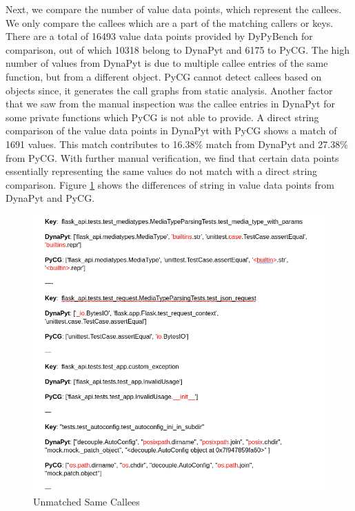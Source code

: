 Next, we compare the number of value data points, which represent the callees.
We only compare the callees which are a part of the matching callers or keys.
There are a total of 16493 value data points provided by DyPyBench for comparison, out of which 10318 belong to DynaPyt and 6175 to PyCG.%
The high number of values from DynaPyt is due to multiple callee entries of the same function, but from a different object.
PyCG cannot detect callees based on objects since, it generates the call graphs from static analysis.
Another factor that we saw from the manual inspection was the callee entries in DynaPyt for some private functions which PyCG is not able to provide. 
A direct string comparison of the value data points in DynaPyt with PyCG shows a match of 1691 values.
This match contributes to 16.38\% match from DynaPyt and 27.38\% from PyCG.
With further manual verification, we find that certain data points essentially representing the same values do not match with a direct string comparison.
Figure \ref{fig:unmatched_value_strings} shows the differences of string in value data points from DynaPyt and PyCG.
\begin{figure}[ht]
    \centering
    \includegraphics[width=0.6\linewidth]{figures/evaluation/string_compare.png}
    \caption[Unmatched Same Callees]{\label{fig:unmatched_value_strings}Unmatched Same Callees }
\end{figure}

